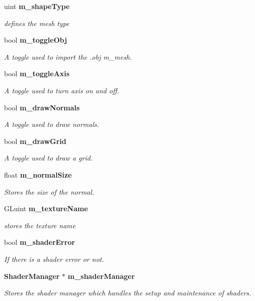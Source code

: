 \begin{DoxyCompactItemize}
uint {\bf m\-\_\-shape\-Type}
\begin{DoxyCompactList}\small\item\em defines the mesh type \end{DoxyCompactList}\item 
bool {\bf m\-\_\-toggle\-Obj}
\begin{DoxyCompactList}\small\item\em A toggle used to import the .obj m\-\_\-mesh. \end{DoxyCompactList}\item 
bool {\bf m\-\_\-toggle\-Axis}
\begin{DoxyCompactList}\small\item\em A toggle used to turn axis on and off. \end{DoxyCompactList}\item 
bool {\bf m\-\_\-draw\-Normals}
\begin{DoxyCompactList}\small\item\em A toggle used to draw normals. \end{DoxyCompactList}\item 
bool {\bf m\-\_\-draw\-Grid}
\begin{DoxyCompactList}\small\item\em A toggle used to draw a grid. \end{DoxyCompactList}\item 
float {\bf m\-\_\-normal\-Size}
\begin{DoxyCompactList}\small\item\em Stores the size of the normal. \end{DoxyCompactList}\item 
G\-Luint {\bf m\-\_\-texture\-Name}
\begin{DoxyCompactList}\small\item\em stores the texture name \end{DoxyCompactList}\item 
bool {\bf m\-\_\-shader\-Error}
\begin{DoxyCompactList}\small\item\em If there is a shader error or not. \end{DoxyCompactList}\item 
{\bf Shader\-Manager} $\ast$ {\bf m\-\_\-shader\-Manager}
\begin{DoxyCompactList}\small\item\em Stores the shader manager which handles the setup and maintenance of shaders. \end{DoxyCompactList}\item 

\end{DoxyCompactItemize}
